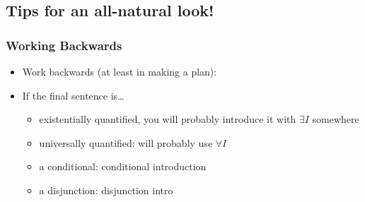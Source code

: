 \subsection{Tips for an all-natural look!}


\begin{frame}
\frametitle{Working Backwards}

\begin{itemize}[<+->]

\item Work backwards (at least in making a plan):

\item If the final sentence is\dots

\begin{itemize}

\item existentially quantified, you will probably introduce it with $\exists I$ somewhere 

\item universally quantified: will probably use $\forall I$

\item a conditional: conditional introduction

\item a disjunction: disjunction intro

\end{itemize}



\end{itemize}
\end{frame}

